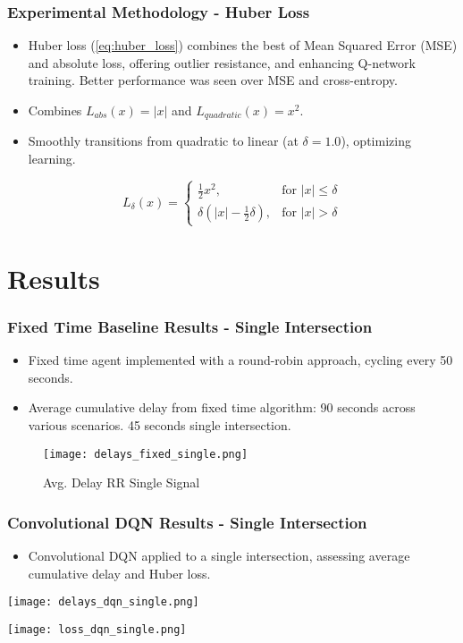\documentclass[compress,12pt]{beamer}
\begin{document}
\begin{frame}[bg=arguelles.png]
      \frametitle{Experimental Methodology - Huber Loss}
      \begin{itemize}
        \item Huber loss (\ref{eq:huber_loss}) combines the best of Mean Squared Error (MSE) and absolute loss, offering outlier resistance, and enhancing Q-network training. Better performance was seen over MSE and cross-entropy.
        \item Combines $L_{abs}(x) = |x|$ and $L_{quadratic}(x) = x^2$.
        \item Smoothly transitions from quadratic to linear (at $\delta=1.0$), optimizing learning.
      \end{itemize}

\begin{equation}
   \label{eq:huber_loss}
    L_{\delta}(x) = \left\{ 
    \begin{array}{ll}
      \frac{1}{2}x^{2}, & \text{for } |x| \leq \delta \\
      \delta\left(|x| - \frac{1}{2}\delta\right), & \text{for } |x| > \delta
    \end{array}
    \right.
\end{equation}
\end{frame}

\section{Results}

\begin{frame}[bg=arguelles.png]
  \frametitle{Fixed Time Baseline Results - Single Intersection}
  \begin{itemize}
    \item Fixed time agent implemented with a round-robin approach, cycling every 50 seconds.
    \item Average cumulative delay from fixed time algorithm: 90 seconds across various scenarios. 45 seconds single intersection.
  \end{itemize}
  \begin{figure}
    \centering
    \texttt{[image: delays\_fixed\_single.png]}
    \caption{Avg. Delay RR Single Signal}
  \end{figure}
\end{frame}

\begin{frame}[bg=arguelles.png]
  \frametitle{Convolutional DQN Results - Single Intersection}
  \begin{itemize}
    \item Convolutional DQN applied to a single intersection, assessing average cumulative delay and Huber loss.
  \end{itemize}
  \begin{minipage}{.5\textwidth}
    \centering
    \texttt{[image: delays\_dqn\_single.png]}
  \end{minipage}%
  \begin{minipage}{.5\textwidth}
    \centering
    \texttt{[image: loss\_dqn\_single.png]}
  \end{minipage}
\end{frame}
\end{document}
